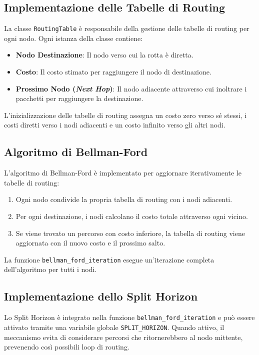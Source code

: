 \documentclass[a4paper,12pt]{article}
\begin{document}
	\subsection{Implementazione delle Tabelle di Routing}
	
	La classe \texttt{RoutingTable} è responsabile della gestione delle tabelle di routing per ogni nodo. Ogni istanza della classe contiene:
	
	\begin{itemize}
		\item \textbf{Nodo Destinazione}: Il nodo verso cui la rotta è diretta.
		\item \textbf{Costo}: Il costo stimato per raggiungere il nodo di destinazione.
		\item \textbf{Prossimo Nodo (\textit{Next Hop})}: Il nodo adiacente attraverso cui inoltrare i pacchetti per raggiungere la destinazione.
	\end{itemize}
	
	L'inizializzazione delle tabelle di routing assegna un costo zero verso sé stessi, i costi diretti verso i nodi adiacenti e un costo infinito verso gli altri nodi.
	
	\subsection{Algoritmo di Bellman-Ford}
	
	L'algoritmo di Bellman-Ford è implementato per aggiornare iterativamente le tabelle di routing:
	
	\begin{enumerate}
		\item Ogni nodo condivide la propria tabella di routing con i nodi adiacenti.
		\item Per ogni destinazione, i nodi calcolano il costo totale attraverso ogni vicino.
		\item Se viene trovato un percorso con costo inferiore, la tabella di routing viene aggiornata con il nuovo costo e il prossimo salto.
	\end{enumerate}
	
	La funzione \texttt{bellman\_ford\_iteration} esegue un'iterazione completa dell'algoritmo per tutti i nodi.
	
	\subsection{Implementazione dello Split Horizon}
	
	Lo Split Horizon è integrato nella funzione \texttt{bellman\_ford\_iteration} e può essere attivato tramite una variabile globale \texttt{SPLIT\_HORIZON}. Quando attivo, il meccanismo evita di considerare percorsi che ritornerebbero al nodo mittente, prevenendo così possibili loop di routing.
	
\end{document}
